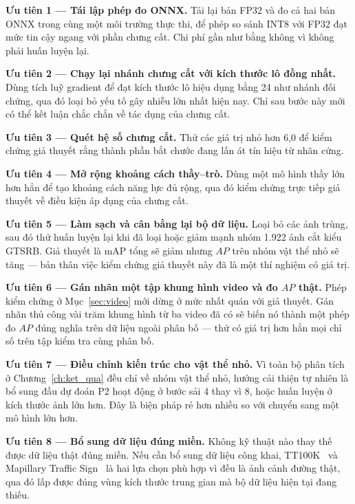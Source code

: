 \textbf{Ưu tiên 1 --- Tái lập phép đo ONNX.} Tải lại bản FP32 và đo cả hai bản ONNX trong cùng một
môi trường thực thi, để phép so sánh INT8 với FP32 đạt mức tin cậy ngang với phần chưng cất. Chi phí
gần như bằng không vì không phải huấn luyện lại.

\textbf{Ưu tiên 2 --- Chạy lại nhánh chưng cất với kích thước lô đồng nhất.} Dùng tích luỹ gradient
để đạt kích thước lô hiệu dụng bằng 24 như nhánh đối chứng, qua đó loại bỏ yếu tố gây nhiễu lớn
nhất hiện nay. Chỉ sau bước này mới có thể kết luận chắc chắn về tác dụng của chưng cất.

\textbf{Ưu tiên 3 --- Quét hệ số chưng cất.} Thử các giá trị nhỏ hơn 6,0 để kiểm chứng giả thuyết
rằng thành phần bắt chước đang lấn át tín hiệu từ nhãn cứng.

\textbf{Ưu tiên 4 --- Mở rộng khoảng cách thầy--trò.} Dùng một mô hình thầy lớn hơn hẳn để tạo
khoảng cách năng lực đủ rộng, qua đó kiểm chứng trực tiếp giả thuyết về điều kiện áp dụng của chưng
cất.

\textbf{Ưu tiên 5 --- Làm sạch và cân bằng lại bộ dữ liệu.} Loại bỏ các ảnh trùng, sau đó thử huấn
luyện lại khi đã loại hoặc giảm mạnh nhóm 1.922 ảnh cắt kiểu GTSRB. Giả thuyết là mAP tổng sẽ giảm
nhưng $AP$ trên nhóm vật thể nhỏ sẽ tăng --- bản thân việc kiểm chứng giả thuyết này đã là một thí
nghiệm có giá trị.

\textbf{Ưu tiên 6 --- Gán nhãn một tập khung hình video và đo $AP$ thật.} Phép kiểm chứng ở
Mục~\ref{sec:video} mới dừng ở mức nhất quán với giả thuyết. Gán nhãn thủ công vài trăm khung hình
từ ba video đã có sẽ biến nó thành một phép đo $AP$ đúng nghĩa trên dữ liệu ngoài phân bố --- thứ có
giá trị hơn hẳn mọi chỉ số trên tập kiểm tra cùng phân bố.

\textbf{Ưu tiên 7 --- Điều chỉnh kiến trúc cho vật thể nhỏ.} Vì toàn bộ phân tích ở
Chương~\ref{ch:ket_qua} đều chỉ về nhóm vật thể nhỏ, hướng cải thiện tự nhiên là bổ sung đầu dự
đoán P2 hoạt động ở bước sải 4 thay vì 8, hoặc huấn luyện ở kích thước ảnh lớn hơn. Đây là biện
pháp rẻ hơn nhiều so với chuyển sang một mô hình lớn hơn.

\textbf{Ưu tiên 8 --- Bổ sung dữ liệu đúng miền.} Không kỹ thuật nào thay thế được dữ liệu thật
đúng miền. Nếu cần bổ sung dữ liệu công khai, TT100K~\cite{zhu2016tt100k} và Mapillary Traffic
Sign~\cite{ertler2020mapillary} là hai lựa chọn phù hợp vì đều là ảnh cảnh đường thật, qua đó lấp
được đúng vùng kích thước trung gian mà bộ dữ liệu hiện tại đang thiếu.
